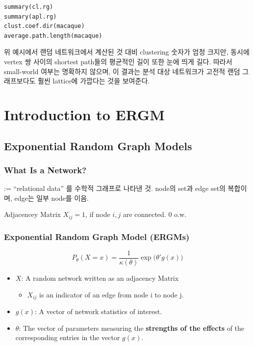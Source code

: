 \documentclass[
]{book}
\providecommand{\tightlist}{%
  \setlength{\itemsep}{0pt}\setlength{\parskip}{0pt}}
\begin{document}
{{{\begin{verbatim}
summary(cl.rg)
summary(apl.rg)
clust.coef.dir(macaque)
average.path.length(macaque)
\end{verbatim}

위 예시에서 랜덤 네트워크에서 계산된 것 대비 clustering 숫자가 엄청 크지만, 동시에 vertex 쌍 사이의 shortest path들의 평균적인 길이 또한 눈에 띄게 길다. 따라서 small-world 여부는 명확하지 않으며, 이 결과는 분석 대상 네트워크가 고전적 랜덤 그래프보다도 훨씬 lattice에 가깝다는 것을 보여준다.

\hypertarget{introduction-to-ergm}{%
\section{Introduction to ERGM}\label{introduction-to-ergm}}

\hypertarget{exponential-random-graph-models}{%
\subsection{Exponential Random Graph Models}\label{exponential-random-graph-models}}

\hypertarget{what-is-a-network}{%
\subsubsection{What Is a Network?}\label{what-is-a-network}}

:= ``relational data'' 를 수학적 그래프로 나타낸 것. node의 set과 edge set의 복합이며, edge는 일부 node를 이음.

Adjacencey Matrix \(X_{ij} = 1\), if node \(i,j\) are connected. \(0\) o.w.

\hypertarget{exponential-random-graph-model-ergms}{%
\subsubsection{Exponential Random Graph Model (ERGMs)}\label{exponential-random-graph-model-ergms}}

\[
P_\theta (X=x) = \frac{1}{\kappa(\theta)} \exp \Big( \theta' g(x) \Big)
\]

\begin{itemize}
\tightlist
\item
  \(X\): A random network written as an adjacency Matrix

  \begin{itemize}
  \tightlist
  \item
    \(X_{ij}\) is an indicator of an edge from node i to node j.
  \end{itemize}
\item
  \(g(x)\): A vector of network statistics of interest.
\item
  \(\theta\): The vector of parameters measuring the \textbf{strengths of the effects} of the corresponding entries in the vector \(g(x)\).


\end{itemize}}}}
\end{document}
